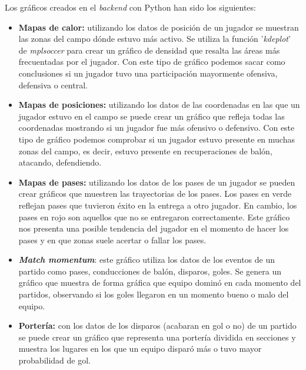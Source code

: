 Los gráficos creados en el \textit{backend} con Python han sido los siguientes:
\begin{itemize}
    \item \textbf{Mapas de calor:} utilizando los datos de posición de un jugador se muestran las zonas del campo dónde estuvo más activo. Se utiliza la función '\textit{kdeplot}' de \textit{mplsoccer} para crear un gráfico de densidad que resalta las áreas más frecuentadas por el jugador. Con este tipo de gráfico podemos sacar como conclusiones si un jugador tuvo una participación mayormente ofensiva, defensiva o central.


    \item \textbf{Mapas de posiciones:} utilizando los datos de las coordenadas en las que un jugador estuvo en el campo se puede crear un gráfico que refleja todas las coordenadas mostrando si un jugador fue más ofensivo o defensivo. Con este tipo de gráfico podemos comprobar si un jugador estuvo presente en muchas zonas del campo, es decir, estuvo presente en recuperaciones de balón, atacando, defendiendo.


    \item \textbf{Mapas de pases:} utilizando los datos de los pases de un jugador se pueden crear gráficos que muestren las trayectorias de los pases. Los pases en verde reflejan pases que tuvieron éxito en la entrega a otro jugador. En cambio, los pases en rojo son aquellos que no se entregaron correctamente. Este gráfico nos presenta una posible tendencia del jugador en el momento de hacer los pases y en que zonas suele acertar o fallar los pases.


    \item \textbf{\textit{Match momentum}}: este gráfico utiliza los datos de los eventos de un partido como pases, conducciones de balón, disparos, goles. Se genera un gráfico que muestra de forma gráfica que equipo dominó en cada momento del partidos, observando si los goles llegaron en un momento bueno o malo del equipo.


    \item \textbf{Portería:} con los datos de los disparos (acabaran en gol o no) de un partido se puede crear un gráfico que representa una portería dividida en secciones y muestra los lugares en los que un equipo disparó más o tuvo mayor probabilidad de gol.

\end{itemize}

